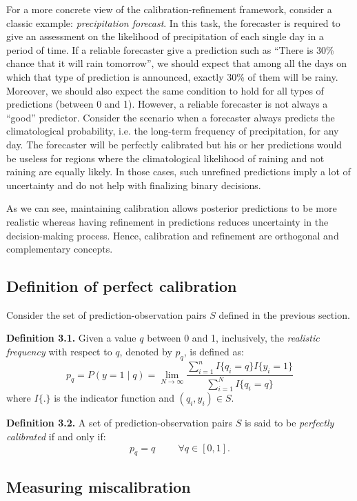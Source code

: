For a more concrete view of the calibration-refinement framework, consider a classic example: \textit{precipitation forecast}. In this task, the forecaster is required to give an assessment on the likelihood of precipitation of each single day in a period of time. If a reliable forecaster give a prediction such as ``There is 30\% chance that it will rain tomorrow'', we should expect that among all the days on which that type of prediction is announced, exactly 30\% of them will be rainy. Moreover, we should also expect the same condition to hold for all types of predictions (between 0 and 1). However, a reliable forecaster is not always a ``good'' predictor. Consider the scenario when a forecaster always predicts the climatological probability, i.e. the long-term frequency of precipitation, for any day. The forecaster will be perfectly calibrated but his or her predictions would be useless for regions where the climatological likelihood of raining and not raining are equally likely. In those cases, such unrefined predictions imply a lot of uncertainty and do not help with finalizing binary decisions.  

As we can see, maintaining calibration allows posterior predictions to be more realistic whereas having refinement in predictions reduces uncertainty in the decision-making process. Hence, calibration and refinement are orthogonal and complementary concepts.    

\subsection{Definition of perfect calibration}

Consider the set of prediction-observation pairs $S$ defined in the previous section.

\textbf{Definition 3.1.} Given a value $q$ between 0 and 1, inclusively, the \textit{realistic frequency} with respect to $q$, denoted by $p_q$, is defined as:
$$p_q = P(y = 1 \mid q) = \lim_{N\to\infty} \frac{\sum_{i=1}^nI\{q_i = q\}I\{y_i = 1\}}{\sum_{i=1}^NI\{q_i = q\}}$$ where $I\{.\}$ is the indicator function and $(q_i, y_i) \in S$.

\textbf{Definition 3.2.} A set of prediction-observation pairs $S$ is said to be \textit{perfectly calibrated} if and only if:
$$p_q = q \hspace{1cm} \forall q \in [0, 1].$$  

\subsection{Measuring miscalibration}


